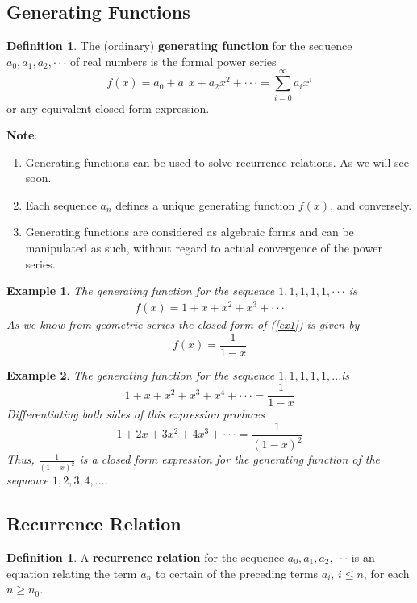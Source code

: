 \documentclass[paper=a4, fontsize=11pt,twoside]{scrartcl}		%
\newtheorem{example}{Example}[section]
\theoremstyle{definition}
\newtheorem{defn}[thm]{Definition}
\theoremstyle{remark}
\begin{document}
\subsection{Generating Functions }
\begin{defn}\label{the01}
The (ordinary) \textbf{generating function} for the sequence $a_0, a_1, a_2,\cdot\cdot\cdot$ of real numbers
is the formal power series
$$
f(x)=a_0+a_1x+a_2x^2+\cdot\cdot\cdot=\sum_{i=0}^\infty a_ix^i
$$
or any equivalent closed form expression.
\end{defn}
\textbf{Note}:
\begin{enumerate}
  \item Generating functions can be used to solve recurrence relations. As we will see soon.
  \item Each sequence ${a_n}$ defines a unique generating function $f(x)$, and conversely.
  \item Generating functions are considered as algebraic forms and can be manipulated as such, without regard to actual convergence of the power series.
\end{enumerate}
\begin{example}
The generating function for the sequence $1, 1, 1, 1, 1,\cdot\cdot\cdot$ is
\begin{align}\label{ex1}
f(x)=1+x+x^2+x^3+\cdot\cdot\cdot
\end{align}
As we know from geometric series the closed form of (\ref{ex1}) is given by
$$
f(x)=\frac{1}{1-x}
$$
\end{example}
\begin{example}
The generating function for the sequence $ 1, 1, 1, 1, 1,... $is
$$1+x+x^2 +x^3 +x^4 +\cdot\cdot\cdot=\frac{1}{1-x}$$
Differentiating both sides of this expression produces
$$1 + 2x + 3x^2 + 4x^3 +\cdot\cdot\cdot=\frac{1}{(1-x)^2}$$
Thus, $\frac{1}{(1-x)^2}$ is a closed form expression for the generating function of the sequence $1, 2, 3, 4,...$.
\end{example}

\subsection{Recurrence Relation}
\begin{defn}
A \textbf{recurrence relation} for the sequence $a_0, a_1, a_2,\cdot\cdot\cdot $ is an equation relating the term $a_n$ to certain of the preceding terms $a_i$, $i\le n$, for each $n\geq n_0$.
\end{defn}
\end{document}
